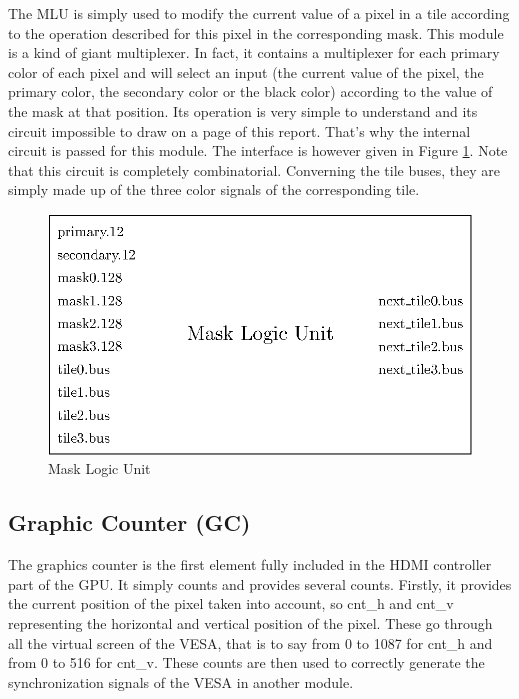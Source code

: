 The MLU is simply used to modify the current value of a pixel in a tile according to the operation 
described for this pixel in the corresponding mask. This module is a kind of giant multiplexer. In 
fact, it contains a multiplexer for each primary color of each pixel and will select an input 
(the current value of the pixel, the primary color, the secondary color or the black color) 
according to the value of the mask at that position. Its operation is very simple to understand 
and its circuit impossible to draw on a page of this report. That's why the internal circuit is 
passed for this module. The interface is however given in Figure \ref{fig:gpu/mlu}.
Note that this circuit is completely combinatorial. Converning the tile buses, they are simply
made up of the three color signals of the corresponding tile.

\begin{figure}[H]
    \centering
    \includegraphics[scale=1.0]{Chapter4-GPU_CLKU/res/mlu}
    \caption{Mask Logic Unit}
    \label{fig:gpu/mlu}
\end{figure}

\subsection{Graphic Counter (GC)}

The graphics counter is the first element fully included in the HDMI controller part of the GPU. 
It simply counts and provides several counts. Firstly, it provides the current position of the 
pixel taken into account, so cnt\_h and cnt\_v representing the horizontal and vertical position 
of the pixel. These go through all the virtual screen of the VESA, that is to say from 0 to 1087 
for cnt\_h and from 0 to 516 for cnt\_v. These counts are then used to correctly generate the 
synchronization signals of the VESA in another module. 

